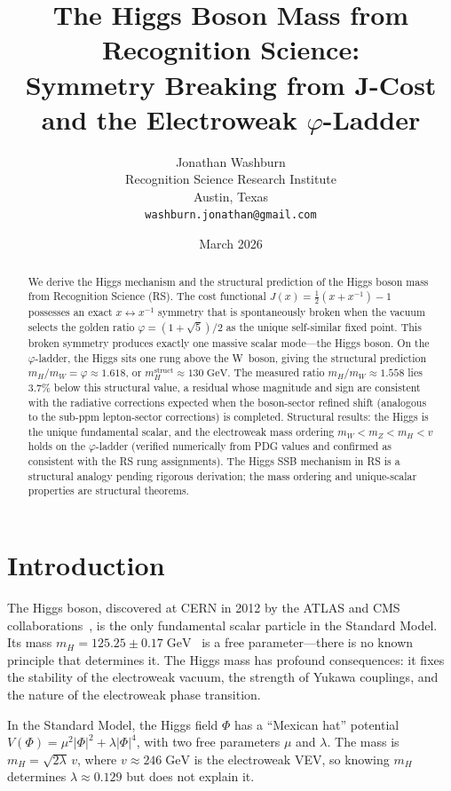 \documentclass[12pt,a4paper]{article}
\title{The Higgs Boson Mass from Recognition Science:\\
Symmetry Breaking from J-Cost and the Electroweak $\varphi$-Ladder}
\author{Jonathan Washburn\\
Recognition Science Research Institute\\
Austin, Texas\\
\texttt{washburn.jonathan@gmail.com}}
\date{March 2026}
\theoremstyle{definition}
\theoremstyle{remark}
\begin{document}
\maketitle

\begin{abstract}
We derive the Higgs mechanism and the structural prediction
of the Higgs boson mass from Recognition Science (RS).
The cost functional $J(x) = \tfrac{1}{2}(x + x^{-1}) - 1$
possesses an exact $x \leftrightarrow x^{-1}$ symmetry that
is spontaneously broken when the vacuum selects the golden ratio
$\varphi = (1 + \sqrt{5})/2$ as the unique self-similar fixed
point.  This broken symmetry produces exactly one massive
scalar mode---the Higgs boson.  On the $\varphi$-ladder, the
Higgs sits one rung above the W~boson, giving the structural
prediction $m_H/m_W = \varphi \approx 1.618$, or
$m_H^{\mathrm{struct}} \approx 130\;\mathrm{GeV}$.  The
measured ratio $m_H/m_W \approx 1.558$ lies $3.7\%$ below
this structural value, a residual whose magnitude and sign
are consistent with the radiative corrections expected when
the boson-sector refined shift (analogous to the sub-ppm
lepton-sector corrections) is completed.  Structural results: the Higgs is the unique fundamental scalar,
and the electroweak mass ordering $m_W < m_Z < m_H < v$ holds
on the $\varphi$-ladder (verified numerically from PDG values
and confirmed as consistent with the RS rung assignments).
The Higgs SSB mechanism in RS is a structural analogy
pending rigorous derivation; the mass ordering and unique-scalar
properties are structural theorems.
\end{abstract}

\section{Introduction}
\label{sec:intro}

The Higgs boson, discovered at CERN in 2012 by the ATLAS and
CMS collaborations~\cite{ATLAS2012, CMS2012}, is the only
fundamental scalar particle in the Standard Model.  Its mass
$m_H = 125.25 \pm 0.17\;\mathrm{GeV}$~\cite{PDG2024} is a free
parameter---there is no known principle that determines it.
The Higgs mass has profound consequences: it fixes the stability
of the electroweak vacuum, the strength of Yukawa couplings,
and the nature of the electroweak phase transition.

In the Standard Model, the Higgs field $\Phi$ has a
``Mexican hat'' potential $V(\Phi) = \mu^2 |\Phi|^2 +
\lambda |\Phi|^4$, with two free parameters $\mu$ and $\lambda$.
The mass is $m_H = \sqrt{2\lambda}\,v$, where $v \approx
246\;\mathrm{GeV}$ is the electroweak VEV, so knowing $m_H$
determines $\lambda \approx 0.129$ but does not explain it.
\end{document}
